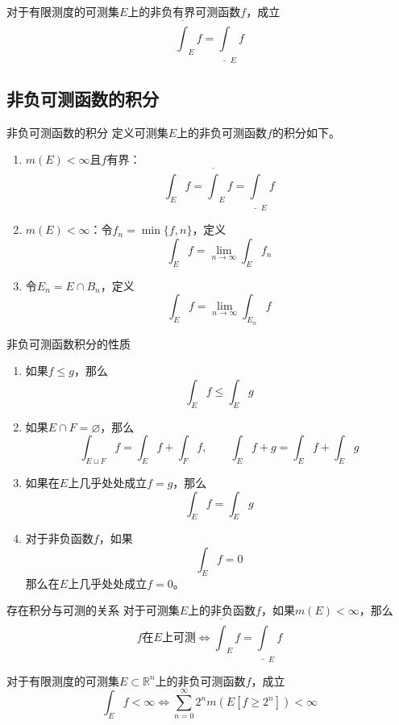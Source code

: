 \documentclass[lang = cn, scheme = chinese, thmcnt = section]{elegantbook}
\newcommand{\R}{\mathbb{R}}            %
\newcommand{\sub}{\subset}             %
\begin{document}
\begin{theorem}
	对于有限测度的可测集$E$上的非负有界可测函数$f$，成立%
	$$
	\overline{\int}_{E}f=\underline{\int}_{E}f
	$$
\end{theorem}

\subsection{非负可测函数的积分}

\begin{definition}{非负可测函数的积分}
	定义可测集$E$上的非负可测函数$f$的积分如下。
	\begin{enumerate}
		\item $m(E)<\infty$且$f$有界：%
		$$
		\int_E f=\overline{\int}_{E}f=\underline{\int}_{E}f
		$$
		\item $m(E)<\infty$：令$f_n=\min\{ f,n \}$，定义%
		$$
		\int_Ef=\lim_{n\to\infty}\int_E f_n
		$$
		\item 令$E_n=E\cap B_n$，定义%
		$$
		\int_Ef=\lim_{n\to\infty}\int_{E_n} f
		$$
	\end{enumerate}
\end{definition}

\begin{proposition}{非负可测函数积分的性质}
	\begin{enumerate}
		\item 如果$f\le g$，那么
		$$
		\int_Ef\le\int_Eg
		$$
		\item 如果$E\cap F=\varnothing$，那么
		$$
		\int_{E\sqcup F}f=\int_{E}f+\int_{F}f,\qquad 
		\int_E f+g=\int_E f+\int_E g
		$$
		\item 如果在$E$上几乎处处成立$f=g$​，那么
		$$
		\int_E f=\int_E g
		$$
		\item 对于非负函数$f$，如果
		$$
		\int_Ef=0
		$$
		那么在$E$上几乎处处成立$f=0$。
	\end{enumerate}
\end{proposition}

\begin{theorem}{存在积分与可测的关系}
	对于可测集$E$上的非负函数$f$，如果$m(E)<\infty$，那么
	$$
	f\text{在}E\text{上可测}
	\iff \overline{\int}_{E}f=\underline{\int}_{E}f
	$$
\end{theorem}

\begin{exercise}
	对于有限测度的可测集$E\sub\R^n$上的非负可测函数$f$，成立
	$$
	\int_Ef<\infty \iff \sum_{n=0}^{\infty}2^n m(E[f\ge 2^n])<\infty
	$$
\end{exercise}
\end{document}
